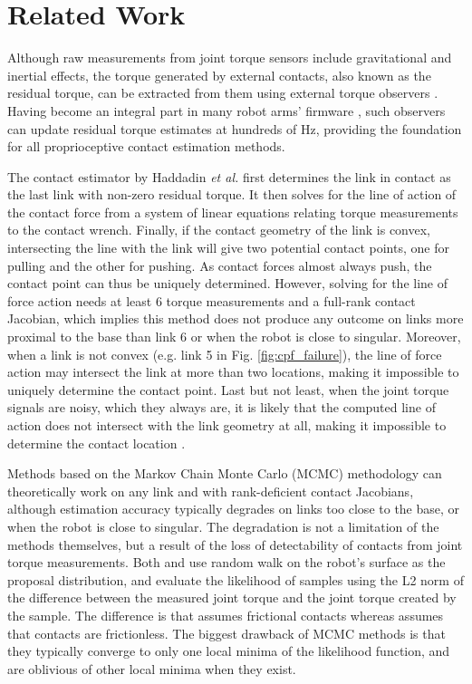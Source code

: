 \section{Related Work}
Although raw measurements from joint torque sensors include gravitational and inertial effects, the torque generated by external contacts, also known as the residual torque, can be extracted from them using external torque observers \cite{haddadin2017robot}. Having become an integral part in many robot arms' firmware \cite{loughlin2007dlr, franka}, such observers can update residual torque estimates at hundreds of Hz, providing the foundation for all proprioceptive contact estimation methods.

The contact estimator by Haddadin \textit{et al.} \cite{haddadin2017robot} first determines the link in contact as the last link with non-zero residual torque. It then solves for the line of action of the contact force from a system of linear equations relating torque measurements to the contact wrench. Finally, if the contact geometry of the link is convex, intersecting the line with the link will give two potential contact points, one for pulling and the other for pushing. As contact forces almost always push, the contact point can thus be uniquely determined. However, solving for the line of force action needs at least 6 torque measurements and a full-rank contact Jacobian, which implies this method does not produce any outcome on links more proximal to the base than link 6 or when the robot is close to singular. Moreover, when a link is not convex (e.g. link 5 in Fig. \ref{fig:cpf_failure}), the line of force action may intersect the link at more than two locations, making it impossible to uniquely determine the contact point. Last but not least, when the joint torque signals are noisy, which they always are, it is likely that the computed line of action does not intersect with the link geometry at all, making it impossible to determine the contact location \cite{manuelli2018localizing}.

Methods based on the Markov Chain Monte Carlo (MCMC) methodology \cite{manuelli2016localizing, zwiener2019armcl} can theoretically work on any link and with rank-deficient contact Jacobians, although estimation accuracy typically degrades on links too close to the base, or when the robot is close to singular. The degradation is not a limitation of the methods themselves, but a result of the loss of detectability of contacts from joint torque measurements. Both \cite{manuelli2016localizing} and \cite{zwiener2019armcl} use random walk on the robot's surface as the proposal distribution, and evaluate the likelihood of samples using the L2 norm of the difference between the measured joint torque and the joint torque created by the sample. The difference is that \cite{manuelli2016localizing} assumes frictional contacts whereas \cite{zwiener2019armcl} assumes that contacts are frictionless. The biggest drawback of MCMC methods is that they typically converge to only one local minima of the likelihood function, and are oblivious of other local minima when they exist.

